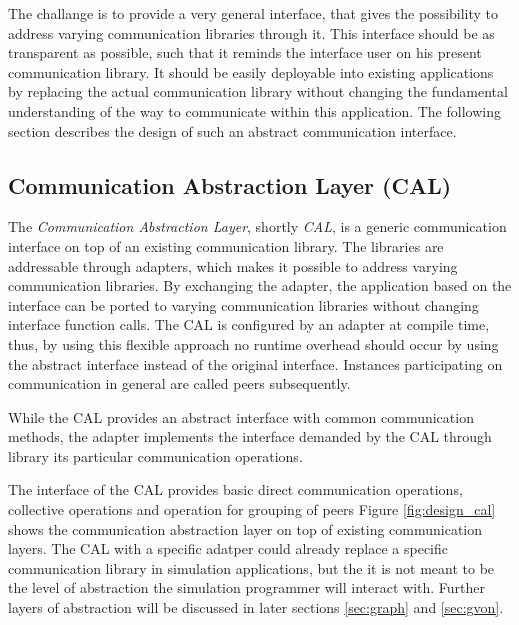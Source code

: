 The challange is to provide a very general interface, that gives the
possibility to address varying communication libraries through it.
This interface should be as transparent as possible, such that it
reminds the interface user on his present communication library.  It
should be easily deployable into existing applications by replacing
the actual communication library without changing the fundamental
understanding of the way to communicate within this application. The
following section describes the design of such an abstract
communication interface.


\subsection{Communication Abstraction Layer (CAL)}
\label{sec:cal}

The \textit{Communication Abstraction Layer}, shortly \textit{CAL}, is
a generic communication interface on top of an existing communication
library. The libraries are addressable through
adapters, which makes it possible to address varying communication
libraries. By exchanging the adapter, the application based on the
interface can be ported to varying communication libraries without
changing interface function calls. The CAL is configured by an adapter
at compile time, thus, by using this flexible approach no runtime
overhead should occur by using the abstract interface instead of the
original interface. Instances participating on communication in general are
called peers subsequently.

While the CAL provides an abstract interface with common communication
methods, the adapter implements the interface demanded by the CAL
through library its particular communication operations.

The interface of the CAL provides basic direct communication
operations, collective operations and operation for grouping of peers
Figure \ref{fig:design_cal} shows the communication abstraction layer
on top of existing communication layers.  The CAL with a specific
adatper could already replace a specific communication library in
simulation applications, but the it is not meant to be the level of
abstraction the simulation programmer will interact with. Further
layers of abstraction will be discussed in later sections
\ref{sec:graph} and \ref{sec:gvon}.

